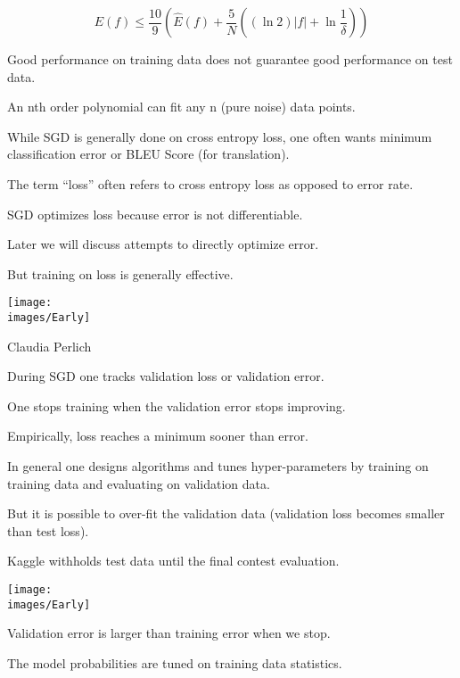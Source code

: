 {{\color{red} $$E(f) \leq \frac{10}{9}\left(\hat{E}(f) + \frac{5}{N}\left((\ln 2)|f| +\ln\frac{1}{\delta}\right)\right)$$}


Good performance on training data does not guarantee good performance on test data.

\vfill
An nth order polynomial can fit any n (pure noise) data points.

While SGD is generally done on cross entropy loss, one often wants minimum classification error or BLEU Score (for translation).

\vfill
The term ``loss'' often refers to cross entropy loss as opposed to error rate.

\vfill
SGD optimizes loss because error is not differentiable.

\vfill
Later we will discuss attempts to directly optimize error.

\vfill
But training on loss is generally effective.



\centerline{\texttt{[image: \\images/Early]}}

\centerline{\huge Claudia Perlich}

\vfill
During SGD one tracks validation loss or validation error.

\vfill
One stops training when the validation error stops improving.

\vfill
Empirically, loss reaches a minimum sooner than error.


In general one designs algorithms and tunes hyper-parameters by training on training data and evaluating on validation data.

\vfill
But it is possible to over-fit the validation data (validation loss becomes smaller than test loss).

\vfill
Kaggle withholds test data until the final contest evaluation.



\centerline{\texttt{[image: \\images/Early]}}

\vfill
Validation error is larger than training error when we stop.

\vfill
The model probabilities are tuned on training data statistics.

}
